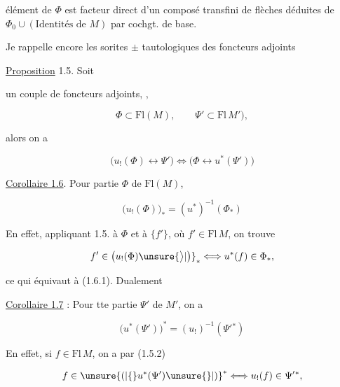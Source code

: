 élément de $\Phi$ est facteur direct d'un composé
transfini de flèches déduites de $\Phi_0\cup(\text{Identités de }M)$
par cochgt. de base.

Je rappelle encore les sorites $\pm$ tautologiques
des foncteurs adjoints

\uline{Proposition} 1.5. Soit


un couple de foncteurs adjoints,  ,

\[
\Phi\subset\mathrm{Fl}(M),\qquad \Psi'\subset\mathrm{Fl}\,M'), 
\]

alors on a

\[
\big(u_!(\Phi)\longleftrightarrow\Psi'\big)\Longleftrightarrow
\big(\Phi\longleftrightarrow u^*(\Psi')\big)\tag*{(1.5.2)}
\]

\uline{Corollaire 1.6}. Pour  partie $\Phi$ de $\mathrm{Fl}(M)$,

\[
\big(u_!(\Phi)\big)_*=(u^*)^{-1}(\Phi_*)\tag*{(1.6.1)}
\]

En effet, appliquant 1.5. à $\Phi$ et à $\{f'\}$,
où $f'\in\mathrm{Fl}\,M$, on trouve

\[
f'\in\big(u_!(\Phi)\unsure{\big\rangle|\big)}_*\Longleftrightarrow u^*(f)\in\Phi_*,
\]

ce qui équivaut à (1.6.1). Dualement

\uline{Corollaire 1.7} : Pour tte partie $\Psi'$ de $M'$, on
a

\[
\big(u^*(\Psi')\big)^*=(u_!)^{-1}(\Psi'{}^*)\tag*{(1.7.1)}
\]


En effet, si $f\in\mathrm{Fl}\,M$, on a par (1.5.2)

\[
f\in\unsure{(|\{}u^*(\Psi')\unsure{\}|)}^{*}\Longleftrightarrow u_!(f)\in\Psi'{}^*,
\]
